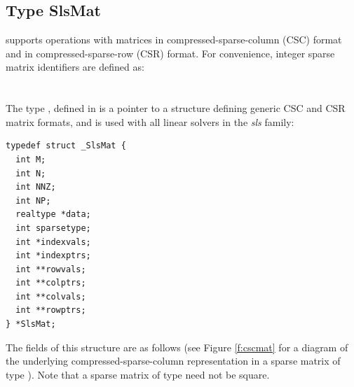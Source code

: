 \subsection{Type SlsMat}
{\sundials} supports operations with matrices in compressed-sparse-column (CSC)
format and in compressed-sparse-row (CSR) format. For convenience, integer sparse 
matrix identifiers are defined as:\\
  \indent {}\\
  \indent {}\\
The type , defined in  is a pointer to a 
structure defining generic CSC and CSR matrix formats, and is
used with all linear solvers in the {\em sls} family:
\begin{verbatim}
typedef struct _SlsMat {
  int M;
  int N;
  int NNZ;
  int NP;
  realtype *data;
  int sparsetype;
  int *indexvals;
  int *indexptrs;
  int **rowvals;
  int **colptrs;
  int **colvals;
  int **rowptrs;
} *SlsMat;
\end{verbatim}
The fields of this structure are as follows (see Figure \ref{f:cscmat}
for a diagram of the underlying compressed-sparse-column
representation in a sparse matrix of type ).  Note that a
sparse matrix of type  need not be square.
